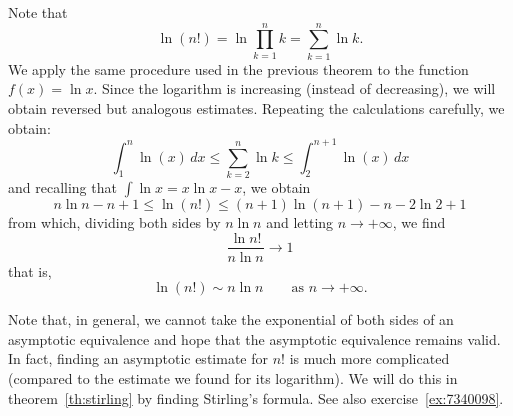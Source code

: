 \begin{example}
\label{ex:498124}%
%
%
Note that
\[
  \ln (n!) = \ln \prod_{k=1}^n k = \sum_{k=1}^n \ln k.
\]
We apply the same procedure used in the previous theorem to the function $f(x) =
\ln x$. Since the logarithm is increasing (instead of decreasing), we will
obtain reversed but analogous estimates. Repeating the calculations carefully,
we obtain:
\[
    \int_1^n \ln(x)\, dx \le  \sum_{k=2}^n \ln k \le \int_2^{n+1} \ln(x) \, dx
\]
and recalling that $\int \ln x = x \ln x - x$, we obtain
\[
  n \ln n - n + 1 \le \ln(n!) \le (n+1) \ln (n+1) - n - 2\ln 2 + 1
\]
from which, dividing both sides by $n \ln n$ and letting $n\to +\infty$, we find
\[
 \frac{\ln n!}{n \ln n}\to 1
\]
that is,
\[
  \ln (n!) \sim n \ln n \qquad \text{as $n\to +\infty$.}
\]

Note that, in general, we cannot take the exponential of both sides of an
asymptotic equivalence and hope that the asymptotic equivalence remains valid.
In fact, finding an asymptotic estimate for $n!$ is much more complicated
(compared to the estimate we found for its logarithm). We will do this in
theorem~\ref{th:stirling} by finding Stirling's formula. See also
exercise~\ref{ex:7340098}.

\end{example}